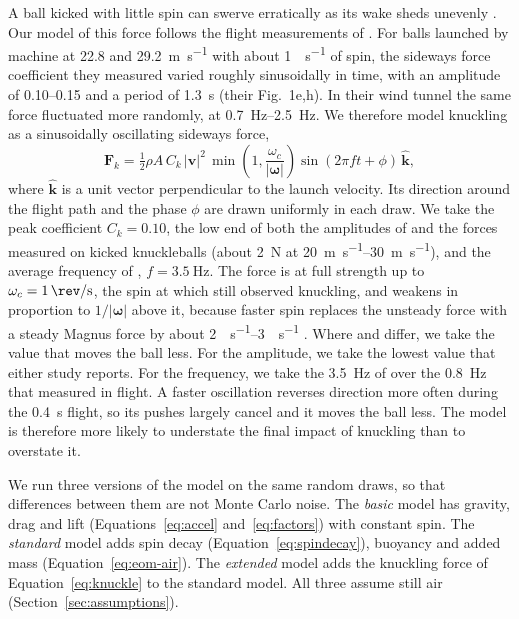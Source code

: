 \documentclass[10pt,a4paper]{article}
\begin{document}
A ball kicked with little spin can swerve erratically
as its wake sheds unevenly \citep{mizota2013}. Our model of this force follows
the flight measurements of \citet{mizota2013}. For balls launched by machine
at \SI{22.8}{} and \SI{29.2}{\metre\per\second} with about
\SI{1}{\rev\per\second} of spin, the sideways force coefficient they measured
varied roughly sinusoidally in time, with an amplitude of 0.10--0.15 and a
period of \SI{1.3}{\second} (their Fig.~1e,h). In their wind tunnel the same
force fluctuated more randomly, at \SIrange{0.7}{2.5}{\hertz}. We therefore
model knuckling as a sinusoidally oscillating sideways force,
\begin{equation}
  \bm{F}_k = \tfrac{1}{2}\rho A\, C_k\, |\bm{v}|^2\,
  \min\!\left(1, \frac{\omega_c}{|\bm{\omega}|}\right)
  \sin(2\pi f t + \phi)\, \hat{\bm{k}},
  \label{eq:knuckle}
\end{equation}
where $\hat{\bm{k}}$ is a unit vector perpendicular to the launch velocity.
Its direction around the flight path and the phase $\phi$ are drawn uniformly
in each draw. We take the peak coefficient $C_k = 0.10$, the low end of both
the amplitudes of \citet{mizota2013} and the forces \citet{hong2010} measured on kicked knuckleballs (about \SI{2}{\newton}
at \SIrange{20}{30}{\metre\per\second}), and the average frequency of
\citet{hong2010}, $f = \SI{3.5}{\hertz}$. The force is at full strength up to
$\omega_c = \SI{1}{\rev\per\second}$, the spin at which \citet{mizota2013}
still observed knuckling, and weakens in proportion to $1/|\bm{\omega}|$ above
it, because faster spin replaces the unsteady force with a steady Magnus force
by about \SIrange{2}{3}{\rev\per\second} \citep{mizota2013}. Where \citet{mizota2013} and \citet{hong2010} differ, we take
the value that moves the ball less. For the amplitude, we take the lowest
value that either study reports. For the frequency, we take the
\SI{3.5}{\hertz} of \citet{hong2010} over the \SI{0.8}{\hertz} that
\citet{mizota2013} measured in flight. A faster oscillation reverses
direction more often during the \SI{0.4}{\second} flight, so its pushes
largely cancel and it moves the ball less. The model is
therefore more likely to understate the final impact of knuckling than to overstate it.

We run three versions of the model on the same random draws, so that
differences between them are not Monte Carlo noise. The \emph{basic} model
has gravity, drag and lift (Equations~\eqref{eq:accel}
and~\eqref{eq:factors}) with constant spin. The \emph{standard} model adds
spin decay (Equation~\eqref{eq:spindecay}), buoyancy and added mass
(Equation~\eqref{eq:eom-air}). The \emph{extended} model adds the knuckling
force of Equation~\eqref{eq:knuckle} to the standard model. All three assume
still air (Section~\ref{sec:assumptions}).
\end{document}
